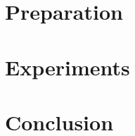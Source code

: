 \documentclass[runningheads]{llncs}
\begin{document}






\section{Preparation}




\section{Experiments}


\section{Conclusion}




\end{document}
